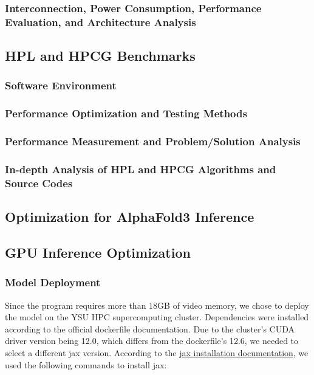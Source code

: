 \documentclass[a4paper,12pt]{article}
\begin{document}
\subsubsection{Interconnection, Power Consumption, Performance Evaluation, and Architecture Analysis}

\subsection{HPL and HPCG Benchmarks}

\subsubsection{Software Environment}

\subsubsection{Performance Optimization and Testing Methods}

\subsubsection{Performance Measurement and Problem/Solution Analysis}

\subsubsection{In-depth Analysis of HPL and HPCG Algorithms and Source Codes}

\subsection{Optimization for AlphaFold3 Inference}

\subsection{GPU Inference Optimization}

\subsubsection{Model Deployment}
Since the program requires more than 18GB of video memory, we chose to deploy the model on the YSU HPC supercomputing cluster. Dependencies were installed according to the official dockerfile documentation. Due to the cluster's CUDA driver version being 12.0, which differs from the dockerfile's 12.6, we needed to select a different jax version. According to the \href{https://docs.jax.dev/en/latest/installation.html#nvidia-gpu}{jax installation documentation}, we used the following commands to install jax:
\end{document}

